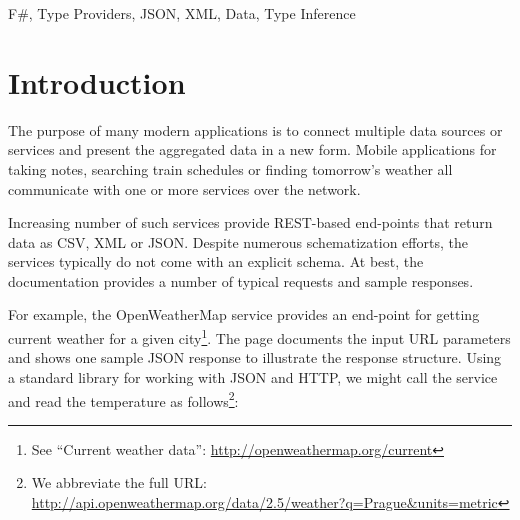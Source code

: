 \documentclass[preprint]{sigplanconf}
\begin{document}
\keywords F\#, Type Providers, JSON, XML, Data, Type Inference



%
%

\section{Introduction}
\label{sec:introduction}

The purpose of many modern applications is to connect multiple data sources or services and
present the aggregated data in a new form. Mobile applications for taking notes, searching train
schedules or finding tomorrow's weather all communicate with one or more services over the network.

Increasing number of such services provide REST-based end-points that return data as CSV, XML
or JSON. Despite numerous schematization efforts, the services typically do not come with an explicit 
schema. At best, the documentation provides a number of typical requests and sample responses.

For example, the OpenWeatherMap service provides an end-point for getting current weather for a 
given city\footnote{See ``Current weather data'': \url{http://openweathermap.org/current}}. The page documents the input 
URL parameters and shows one sample JSON response to illustrate the response structure.
Using a standard library for working with JSON and HTTP, we might call the service and 
read the temperature as follows\footnote{We abbreviate the full URL: 
\url{http://api.openweathermap.org/data/2.5/weather?q=Prague\&units=metric}}:
\end{document}
